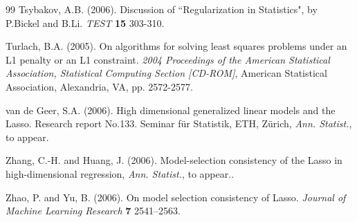 \documentclass[dvips,aos]{imsart}
\numberwithin{equation}{section}
\theoremstyle{plain}
\begin{document}
\begin{thebibliography}{99}
{\sc Tsybakov, A.B.} (2006). Discussion of ``Regularization in
Statistics", by P.Bickel and B.Li. {\it TEST} {\bf 15} 303-310.

{\sc Turlach, B.A.} (2005). On algorithms for solving least squares
problems under an L1 penalty or an L1 constraint. {\em 2004
Proceedings of the American Statistical Association, Statistical
Computing Section [CD-ROM]}, American Statistical Association,
Alexandria, VA, pp. 2572-2577.


 {\sc van de Geer, S.A.} (2006). High dimensional
generalized linear models and the Lasso. Research report No.133.
Seminar f\"ur Statistik, ETH, Z\"urich, \emph{Ann. Statist.}, to appear.

 {\sc Zhang, C.-H.} and {\sc Huang, J.} (2006).
Model-selection consistency of the Lasso in high-dimensional
regression, \emph{Ann. Statist.}, to appear..

{\sc Zhao, P.} and {\sc Yu, B.} (2006). On model selection
consistency of Lasso. {\em Journal of Machine Learning Research}
{\bf 7} 2541--2563.

\end{thebibliography}
\end{document}
